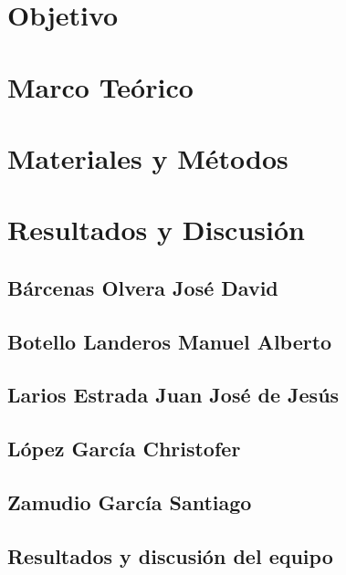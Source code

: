 \documentclass{article}
\begin{document}
\thispagestyle{empty}%
\tableofcontents
\listoffigures
\listoftables
\newpage



\section{Objetivo}


\section{Marco Teórico}
    
\section{Materiales y Métodos}
    
\section{Resultados y Discusión}
    
    \subsection{Bárcenas Olvera José David}
       
    \subsection{Botello Landeros Manuel Alberto}
        
    \subsection{Larios Estrada Juan José de Jesús}
        
    \subsection{López García Christofer}
        
    \subsection{Zamudio García Santiago}
        
    \subsection{Resultados y discusión del equipo}
        
\end{document}
